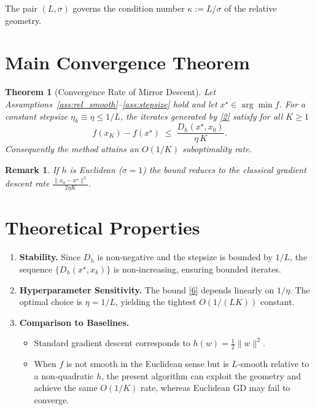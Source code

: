 \documentclass{article}
\newtheorem{theorem}{Theorem}
\newtheorem{remark}{Remark}
\begin{document}
The pair $(L,\sigma)$ governs the condition number
$\kappa:=L/\sigma$ of the relative geometry.

\section*{Main Convergence Theorem}
\begin{theorem}[Convergence Rate of Mirror Descent]
\label{thm:conv}
Let Assumptions~\ref{ass:rel_smooth}--\ref{ass:stepsize} hold and
let $x^{\star}\in\arg\min f$.  For a constant stepsize
$\eta_k\equiv\eta\le 1/L$, the iterates generated by \eqref{2}
satisfy for all $K\ge1$
\[
f(x_{K})-f(x^{\star})
\;\le\;
\frac{D_{h}(x^{\star},x_{0})}{\eta\,K}.
\tag{6}
\]
Consequently the method attains an $O(1/K)$ suboptimality rate.
\end{theorem}

\begin{remark}
If $h$ is Euclidean ($\sigma=1$) the bound reduces to the classical
gradient descent rate $ \frac{\|x_{0}-x^{\star}\|^{2}}{2\eta K} $.
\end{remark}

\section*{Theoretical Properties}
\begin{enumerate}
\item \textbf{Stability.}  Since $D_h$ is non‑negative and the stepsize is
bounded by $1/L$, the sequence $\{D_h(x^{\star},x_k)\}$ is non‑increasing,
ensuring bounded iterates.
\item \textbf{Hyperparameter Sensitivity.}  The bound \eqref{6} depends
linearly on $1/\eta$.  The optimal choice is $\eta=1/L$, yielding the
tightest $O(1/(\!L K))$ constant.
\item \textbf{Comparison to Baselines.}
\begin{itemize}
\item Standard gradient descent corresponds to $h(w)=\tfrac12\|w\|^{2}$.
\item When $f$ is not smooth in the Euclidean sense but is $L$‑smooth
relative to a non‑quadratic $h$, the present algorithm can exploit the
geometry and achieve the same $O(1/K)$ rate, whereas Euclidean GD may
fail to converge.
\end{itemize}
\end{enumerate}
\end{document}
